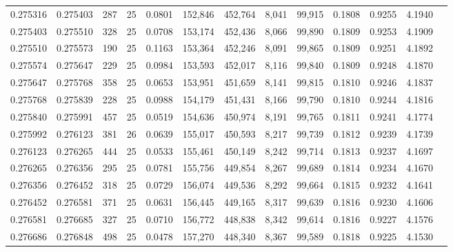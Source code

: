 \begin{tabular}{rrrrrrrrrrrrr}
0.275316 & 0.275403 &   287 &  25 &                                     0.0801 & 152,846 & 452,764 &   8,041 &  99,915 & 0.1808 & 0.9255 & 4.1940 \\
0.275403 & 0.275510 &   328 &  25 &                                     0.0708 & 153,174 & 452,436 &   8,066 &  99,890 & 0.1809 & 0.9253 & 4.1909 \\
0.275510 & 0.275573 &   190 &  25 &                                     0.1163 & 153,364 & 452,246 &   8,091 &  99,865 & 0.1809 & 0.9251 & 4.1892 \\
0.275574 & 0.275647 &   229 &  25 &                                     0.0984 & 153,593 & 452,017 &   8,116 &  99,840 & 0.1809 & 0.9248 & 4.1870 \\
0.275647 & 0.275768 &   358 &  25 &                                     0.0653 & 153,951 & 451,659 &   8,141 &  99,815 & 0.1810 & 0.9246 & 4.1837 \\
0.275768 & 0.275839 &   228 &  25 &                                     0.0988 & 154,179 & 451,431 &   8,166 &  99,790 & 0.1810 & 0.9244 & 4.1816 \\
0.275840 & 0.275991 &   457 &  25 &                                     0.0519 & 154,636 & 450,974 &   8,191 &  99,765 & 0.1811 & 0.9241 & 4.1774 \\
0.275992 & 0.276123 &   381 &  26 &                                     0.0639 & 155,017 & 450,593 &   8,217 &  99,739 & 0.1812 & 0.9239 & 4.1739 \\
0.276123 & 0.276265 &   444 &  25 &                                     0.0533 & 155,461 & 450,149 &   8,242 &  99,714 & 0.1813 & 0.9237 & 4.1697 \\
0.276265 & 0.276356 &   295 &  25 &                                     0.0781 & 155,756 & 449,854 &   8,267 &  99,689 & 0.1814 & 0.9234 & 4.1670 \\
0.276356 & 0.276452 &   318 &  25 &                                     0.0729 & 156,074 & 449,536 &   8,292 &  99,664 & 0.1815 & 0.9232 & 4.1641 \\
0.276452 & 0.276581 &   371 &  25 &                                     0.0631 & 156,445 & 449,165 &   8,317 &  99,639 & 0.1816 & 0.9230 & 4.1606 \\
0.276581 & 0.276685 &   327 &  25 &                                     0.0710 & 156,772 & 448,838 &   8,342 &  99,614 & 0.1816 & 0.9227 & 4.1576 \\
0.276686 & 0.276848 &   498 &  25 &                                     0.0478 & 157,270 & 448,340 &   8,367 &  99,589 & 0.1818 & 0.9225 & 4.1530 \\

\end{tabular}
